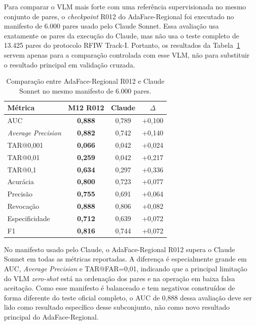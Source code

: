 Para comparar o VLM mais forte com uma referência supervisionada no mesmo conjunto de pares, o \textit{checkpoint} R012 do AdaFace-Regional foi executado no manifesto de 6.000 pares usado pelo Claude Sonnet. Essa avaliação usa exatamente os pares da execução do Claude, mas não usa o teste completo de 13.425 pares do protocolo RFIW Track-I. Portanto, os resultados da Tabela~\ref{tab:m12_claude_manifest} servem apenas para a comparação controlada com esse VLM, não para substituir o resultado principal em validação cruzada.

\begin{table}[htbp]
\centering
\caption{Comparação entre AdaFace-Regional R012 e Claude Sonnet no mesmo manifesto de 6.000 pares.}
\label{tab:m12_claude_manifest}
\small
\setlength{\tabcolsep}{3pt}
\begin{tabularx}{0.92\textwidth}{Xccc}
\hline
\textbf{Métrica} & \textbf{M12 R012} & \textbf{Claude} & \textbf{$\Delta$} \\
\hline
AUC & \textbf{0{,}888} & 0{,}789 & +0{,}100 \\
\textit{Average Precision} & \textbf{0{,}882} & 0{,}742 & +0{,}140 \\
TAR@0{,}001 & \textbf{0{,}066} & 0{,}042 & +0{,}024 \\
TAR@0{,}01 & \textbf{0{,}259} & 0{,}042 & +0{,}217 \\
TAR@0{,}1 & \textbf{0{,}634} & 0{,}297 & +0{,}336 \\
Acurácia & \textbf{0{,}800} & 0{,}723 & +0{,}077 \\
Precisão & \textbf{0{,}755} & 0{,}691 & +0{,}064 \\
Revocação & \textbf{0{,}888} & 0{,}806 & +0{,}082 \\
Especificidade & \textbf{0{,}712} & 0{,}639 & +0{,}072 \\
F1 & \textbf{0{,}816} & 0{,}744 & +0{,}072 \\
\hline
\end{tabularx}
\end{table}

No manifesto usado pelo Claude, o AdaFace-Regional R012 supera o Claude Sonnet em todas as métricas reportadas. A diferença é especialmente grande em AUC, \textit{Average Precision} e TAR@FAR=0{,}01, indicando que a principal limitação do VLM \textit{zero-shot} está na ordenação dos pares e na operação em baixa falsa aceitação. Como esse manifesto é balanceado e tem negativos construídos de forma diferente do teste oficial completo, o AUC de 0,888 dessa avaliação deve ser lido como resultado específico desse subconjunto, não como novo resultado principal do AdaFace-Regional.

